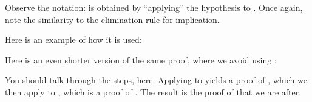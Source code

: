 \documentclass[letterpaper,10pt,english]{sphinxmanual}
\begin{document}
\sphinxAtStartPar
Observe the notation:  is obtained by “applying” the hypothesis  to . Once again, note the similarity to the elimination rule for implication.

\sphinxAtStartPar
Here is an example of how it is used:

\begin{sphinxVerbatim}[commandchars=\\\{\}]
   
      

                     
  
       
          
     
\end{sphinxVerbatim}

\sphinxAtStartPar
Here is an even shorter version of the same proof, where we avoid using :

\begin{sphinxVerbatim}[commandchars=\\\{\}]
                     
  
       
\end{sphinxVerbatim}

\sphinxAtStartPar
You should talk through the steps, here. Applying  to  yields a proof of , which we then apply to , which is a proof of . The result is the proof of  that we are after.
\end{document}
